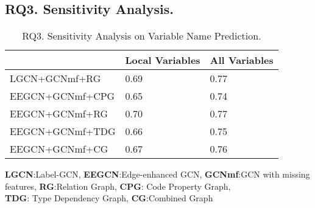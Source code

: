 \subsection{{\bf RQ3. Sensitivity Analysis.}}
\label{empirical-rq3}

\begin{table}[t]
	\caption{RQ3. Sensitivity Analysis on Variable Name Prediction.}
	\begin{center}
		\small
		\renewcommand{\arraystretch}{1} 
		\begin{tabular}{p{2.5cm}<{\centering}|p{2cm}<{\centering}|p{2cm}<{\centering}}
			\hline
			                    & Local Variables & All Variables\\
			\hline
			LGCN+GCNmf+RG       & 0.69            & 0.77    \\
			EEGCN+GCNmf+CPG     & 0.65            & 0.74    \\
			EEGCN+GCNmf+RG      & 0.70            & 0.77    \\
			EEGCN+GCNmf+TDG     & 0.66            & 0.75    \\
			EEGCN+GCNmf+CG      & 0.67            & 0.76    \\
			\hline
		\end{tabular}
		\label{RQ3-result-1}
		{\bf LGCN}:Label-GCN, {\bf EEGCN}:Edge-enhanced GCN, {\bf GCNmf}:GCN with missing features, {\bf RG}:Relation Graph, {\bf CPG}: Code Property Graph, \\{\bf TDG}: Type Dependency Graph, {\bf CG}:Combined Graph
	\end{center}
\end{table}


